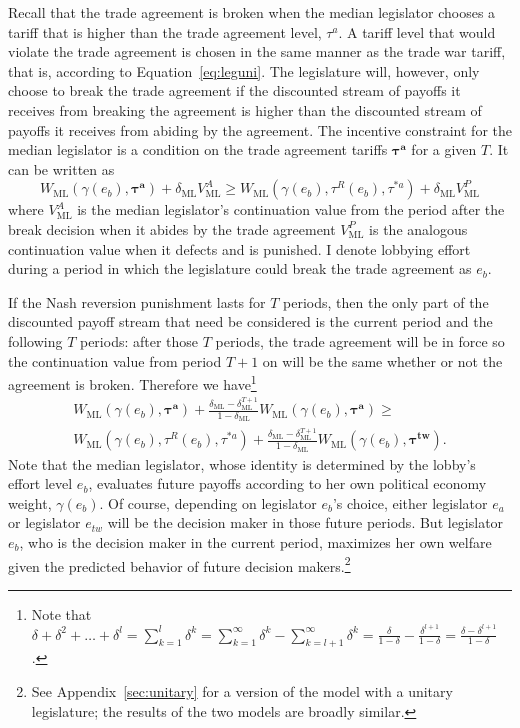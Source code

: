 \documentclass[authoryear, review]{elsarticle}
\newcommand{\bta}{\bm{\tau^a}}
\newcommand{\ga}{\gamma}
\newcommand{\btw}{\bm{\tau^{tw}}}
\newcommand{\de}{\delta}
\begin{document}
Recall that the trade agreement is broken when the median legislator chooses a tariff that is higher than the trade agreement level, $\tau^a$. A tariff level that would violate the trade agreement is chosen in the same manner as the trade war tariff, that is, according to Equation~\ref{eq:leguni}. The legislature will, however, only choose to break the trade agreement if the discounted stream of payoffs it receives from breaking the agreement is higher than the discounted stream of payoffs it receives from abiding by the agreement. The incentive constraint for the median legislator is a condition on the trade agreement tariffs $\bta$ for a given $T$. It can be written as
\[
  W_\text{ML}(\ga(e_b),\bta) + \de_\text{ML} V^A_\text{ML} \geq W_\text{ML}(\ga(e_b),\tau^R(e_b),\tau^{*a}) + \de_\text{ML} V^P_\text{ML}
\]
where $V^A_\text{ML}$ is the median legislator's continuation value from the period after the break decision when it abides by the trade agreement $V^P_\text{ML}$ is the analogous continuation value when it defects and is punished. I denote lobbying effort during a period in which the legislature could break the trade agreement as $e_b$.

If the Nash reversion punishment lasts for $T$ periods, then the only part of the discounted payoff stream that need be considered is the current period and the following $T$ periods: after those $T$ periods, the trade agreement will be in force so the continuation value from period $T+1$ on will be the same whether or not the agreement is broken. Therefore we have\footnote{Note that $\de + \de^2 + \ldots + \de^l = \sum_{k=1}^l \de^k= \sum_{k=1}^\infty \de^k - \sum_{k=l+1}^\infty \de^k = \frac{\de}{1-\de} - \frac{\de^{l+1}}{1-\de} = \frac{\de - \de^{l+1}}{1-\de} $.}
\begin{multline}
  W_\text{ML}(\ga(e_b),\bta) + \frac{\de_\text{ML} - \de_\text{ML}^{T+1}}{1-\de_\text{ML}} W_\text{ML}(\ga(e_b),\bta) \geq \\
	W_\text{ML}(\ga(e_b),\tau^R(e_b),\tau^{*a}) + \frac{\de_\text{ML} - \de_\text{ML}^{T+1}}{1-\de_\text{ML}} W_\text{ML}(\ga(e_b),\btw).
  \label{ine:leg}
\end{multline}
Note that the median legislator, whose identity is determined by the lobby's effort level $e_b$, evaluates future payoffs according to her own political economy weight, $\ga(e_b)$. Of course, depending on legislator $e_b$'s choice, either legislator $e_a$ or legislator $e_{tw}$ will be the decision maker in those future periods. But legislator $e_b$, who is the decision maker in the current period, maximizes her own welfare given the predicted behavior of future decision makers.\footnote{See Appendix~\ref{sec:unitary} for a version of the model with a unitary legislature; the results of the two models are broadly similar.}
\end{document}
